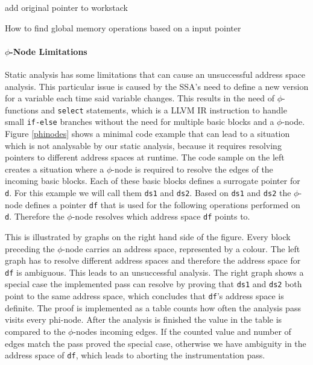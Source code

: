 \begin{algorithm}[t]
add original pointer to workstack\;
\caption{How to find global memory operations based on a input pointer}
\label{anal-algo}
\end{algorithm}
\paragraph{$\phi$-Node Limitations}\label{patho}
Static analysis has some limitations that can cause an unsuccessful address space analysis. This particular issue is caused by the SSA's need to define a new version for a variable each time said variable changes. This results in the need of $\phi$-functions and \verb|select| statements, which is a LLVM IR instruction to handle small \verb|if-else| branches without the need for multiple basic blocks
and a $\phi$-node. Figure \ref{phinodes} shows a minimal code example that can lead to a situation which is not analysable by our static analysis, because it requires resolving pointers to different address spaces at runtime. The code sample on the left creates a situation where a $\phi$-node is required to resolve the edges of the incoming basic blocks. Each of these basic blocks defines a surrogate pointer for \verb|d|. For this example we will call them \verb|ds1| and \verb|ds2|. Based on \verb|ds1| and \verb|ds2| the $\phi$-node defines a pointer \verb|df| that is used for the following operations performed on \verb|d|. Therefore the $\phi$-node resolves which address space \verb|df| points to. 

This is illustrated by graphs on the right hand side of the figure. Every block preceding the $\phi$-node carries an address space, represented by a colour.
The left graph has to resolve different address spaces and therefore the address space for \verb|df| is ambiguous. This leads to an unsuccessful analysis. The right graph shows a special case the implemented pass can resolve by proving that \verb|ds1| and \verb|ds2| both point to the same address space, which concludes that \verb|df|'s address space is definite. The proof is implemented as a table counts how often the analysis pass visits every phi-node. After the analysis is finished the value in the table is compared to the $\phi$-nodes incoming edges. If the counted value and number of edges match the pass proved the special case, otherwise we have ambiguity in the address space of \verb|df|, which leads to aborting the instrumentation pass.

